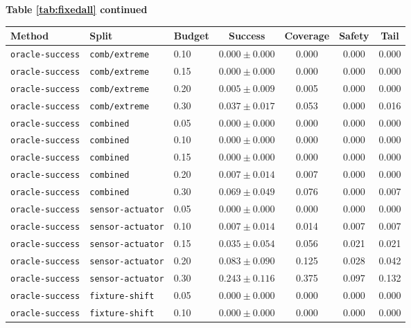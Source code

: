 \documentclass{article}
\begin{document}
\begin{center}
\textbf{Table \ref{tab:fixedall} continued}\\[0.4ex]
\begin{tabular}{lllcccc}
\toprule
Method & Split & Budget & Success & Coverage & Safety & Tail \\
\midrule
\texttt{oracle-success} & \texttt{comb/extreme} & 0.10 & $0.000 \pm 0.000$ & 0.000 & 0.000 & 0.000 \\
\texttt{oracle-success} & \texttt{comb/extreme} & 0.15 & $0.000 \pm 0.000$ & 0.000 & 0.000 & 0.000 \\
\texttt{oracle-success} & \texttt{comb/extreme} & 0.20 & $0.005 \pm 0.009$ & 0.005 & 0.000 & 0.000 \\
\texttt{oracle-success} & \texttt{comb/extreme} & 0.30 & $0.037 \pm 0.017$ & 0.053 & 0.000 & 0.016 \\
\texttt{oracle-success} & \texttt{combined} & 0.05 & $0.000 \pm 0.000$ & 0.000 & 0.000 & 0.000 \\
\texttt{oracle-success} & \texttt{combined} & 0.10 & $0.000 \pm 0.000$ & 0.000 & 0.000 & 0.000 \\
\texttt{oracle-success} & \texttt{combined} & 0.15 & $0.000 \pm 0.000$ & 0.000 & 0.000 & 0.000 \\
\texttt{oracle-success} & \texttt{combined} & 0.20 & $0.007 \pm 0.014$ & 0.007 & 0.000 & 0.000 \\
\texttt{oracle-success} & \texttt{combined} & 0.30 & $0.069 \pm 0.049$ & 0.076 & 0.000 & 0.007 \\
\texttt{oracle-success} & \texttt{sensor-actuator} & 0.05 & $0.000 \pm 0.000$ & 0.000 & 0.000 & 0.000 \\
\texttt{oracle-success} & \texttt{sensor-actuator} & 0.10 & $0.007 \pm 0.014$ & 0.014 & 0.007 & 0.007 \\
\texttt{oracle-success} & \texttt{sensor-actuator} & 0.15 & $0.035 \pm 0.054$ & 0.056 & 0.021 & 0.021 \\
\texttt{oracle-success} & \texttt{sensor-actuator} & 0.20 & $0.083 \pm 0.090$ & 0.125 & 0.028 & 0.042 \\
\texttt{oracle-success} & \texttt{sensor-actuator} & 0.30 & $0.243 \pm 0.116$ & 0.375 & 0.097 & 0.132 \\
\texttt{oracle-success} & \texttt{fixture-shift} & 0.05 & $0.000 \pm 0.000$ & 0.000 & 0.000 & 0.000 \\
\texttt{oracle-success} & \texttt{fixture-shift} & 0.10 & $0.000 \pm 0.000$ & 0.000 & 0.000 & 0.000 \\

\end{tabular}
\end{center}
\end{document}
